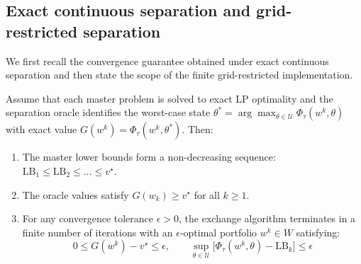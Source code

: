 \documentclass[smallextended]{svjour3}
\begin{document}
\subsection{Exact continuous separation and grid-restricted separation}
We first recall the convergence guarantee obtained under exact continuous separation and then state the scope of the finite grid-restricted implementation.

\begin{proposition}
Assume that each master problem is solved to exact LP optimality and the separation oracle identifies the worst-case state $\theta^* = \arg\max_{\theta \in \mathcal{U}} \Phi_\tau(w^k, \theta)$ with exact value $G(w^k) = \Phi_\tau(w^k, \theta^*)$. Then:
\begin{enumerate}
    \item The master lower bounds form a non-decreasing sequence: $\mathrm{LB}_1 \le \mathrm{LB}_2 \le \dots \le v^\star$.
    \item The oracle values satisfy $G(w_k) \ge v^\star$ for all $k \ge 1$.
    \item For any convergence tolerance $\epsilon > 0$, the exchange algorithm terminates in a finite number of iterations with an $\epsilon$-optimal portfolio $w^k \in W$ satisfying:
    \begin{equation}
        0 \le G(w^k) - v^\star \le \epsilon, \qquad \sup_{\theta \in \mathcal{U}} \bigl[\Phi_\tau(w^k, \theta) - \mathrm{LB}_k\bigr] \le \epsilon
    \end{equation}
\end{enumerate}
\end{proposition}
\end{document}
